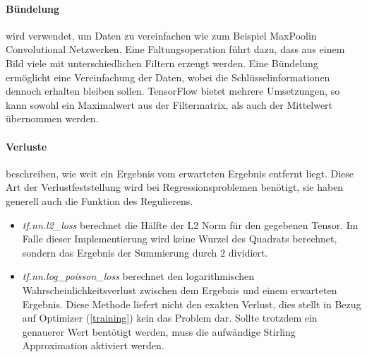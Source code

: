 \paragraph{Bündelung} wird verwendet, um Daten zu vereinfachen wie zum Beispiel \glqq MaxPool\grqq in Convolutional Netzwerken. 
Eine Faltungsoperation führt dazu, dass aus einem Bild viele mit unterschiedlichen Filtern erzeugt werden.
Eine Bündelung ermöglicht eine Vereinfachung der Daten, wobei die Schlüsselinformationen dennoch erhalten bleiben sollen. 
TensorFlow bietet mehrere Umsetzungen, so kann sowohl ein Maximalwert aus der Filtermatrix, als auch der Mittelwert übernommen werden. 

\paragraph{Verluste} beschreiben, wie weit ein Ergebnis vom erwarteten Ergebnis entfernt liegt. 
Diese Art der Verlustfeststellung wird bei Regressionsproblemen benötigt, sie haben generell auch die Funktion des Regulierens.
\begin{itemize}
	\item \textit{tf.nn.l2\_loss} berechnet die Hälfte der L2 Norm für den gegebenen Tensor. %
	Im Falle dieser Implementierung wird keine Wurzel des Quadrats berechnet, sondern das Ergebnis der Summierung durch $2$ dividiert.
	\item \textit{tf.nn.log\_poisson\_loss} berechnet den logarithmischen Wahrscheinlichkeitsverlust zwischen dem Ergebnis und einem erwarteten Ergebnis. 
	Diese Methode liefert nicht den exakten Verlust, dies stellt in Bezug auf Optimizer (\ref{training}) kein das Problem dar. 
	Sollte trotzdem ein genauerer Wert bentötigt werden, muss die aufwändige Stirling Approximation \cite{feller1968introduction} aktiviert werden. 
\end{itemize}

